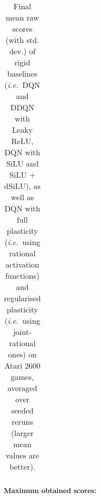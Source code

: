 \documentclass[accepted]{article}
\theoremstyle{plain}
\theoremstyle{definition}
\theoremstyle{remark}
\newcommand{\ie}{\emph{i.e.}~}
\begin{document}
\begin{table}[H]
{\begin{tabular}{@{}lllllllll@{}}
\end{tabular}
}
\caption{Final mean raw scores (with std. dev.) of rigid baselines (\ie DQN and DDQN with Leaky ReLU, DQN with SiLU and SiLU + dSiLU), as well as DQN with full plasticity (\ie using rational activation functions) and regularised plasticity (\ie using joint-rational ones) on Atari 2600 games, averaged over  seeded reruns (larger mean values are better).}
\label{app:all_scores}
\end{table}

\textbf{Maximum obtained scores:}

\begin{table}[H]
\centering
{}
\end{table}
\end{document}
